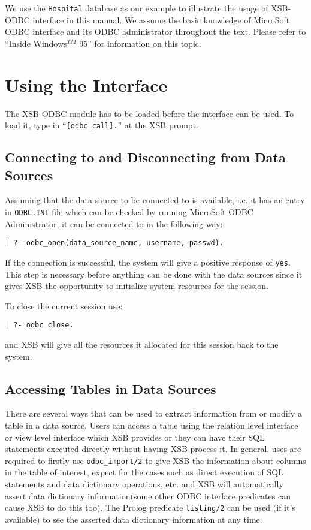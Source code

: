 We use the {\tt Hospital} database as our example to illustrate 
the usage of XSB-ODBC interface in this manual. We assume the basic 
knowledge of MicroSoft ODBC interface and its ODBC administrator 
throughout the text.  Please refer to ``Inside Windows$^{TM}$ 95''
 for information on this topic.

\section{Using the Interface}

The XSB-ODBC module has to be loaded before the interface can be used.  
To load it, type in ``{\tt [odbc\_call].}'' at the XSB prompt.

\subsection{Connecting to and Disconnecting from Data Sources}

Assuming that the data source to be connected to is available, i.e. it has an 
entry in {\tt ODBC.INI} file which can be checked by running MicroSoft 
ODBC Administrator, it can be connected to in the following way: 

\begin{center}
{\tt  | ?- odbc\_open(data\_source\_name, username, passwd).}
\end{center}

If the connection is successful, the system will give a positive response of 
{\tt yes}.  This step is necessary before anything can be done with the data 
sources since it gives XSB the opportunity to initialize system resources for 
the session.

To close the current session use:
\begin{center}
{\tt  | ?- odbc\_close.}
\end{center}

and XSB will give all the resources  it allocated for this session back to the
system.

\subsection{Accessing Tables in Data Sources}

There are several ways that can be used to extract information from or modify 
a table in a data source.  Users can access a table using the relation level interface 
or view level interface which XSB provides or they can have their SQL statements 
executed directly without having XSB process it.  In general,  uses are required 
to firstly use {\tt odbc\_import/2} to give XSB the information about columns 
in the table of interest, expect for the cases such as direct execution of SQL 
statements and data dictionary operations, etc. and XSB will automatically assert 
data dictionary information$($some other ODBC interface predicates can 
cause XSB to do this too$)$. The Prolog predicate {\tt listing/2} can be used
$($if it's available$)$ to see the asserted data dictionary information at any time.  

